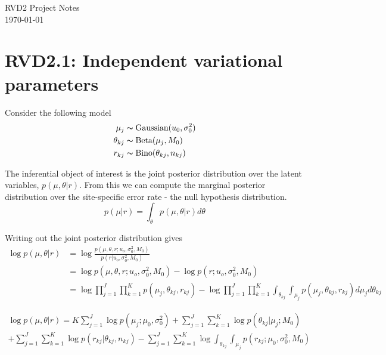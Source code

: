 \documentclass[10pt, letterpaper]{article}
\begin{document}
\linespread{1} %
\small \normalsize %
\begin{flushright}
RVD2 Project Notes \\
\today
\end{flushright}

\section*{RVD2.1: Independent variational parameters}

Consider the following model
\begin{align}
\mu_j &\thicksim \text{Gaussian}(u_0,\sigma^2_0)\\
\theta_{kj} &\thicksim \text{Beta}(\mu_j,M_0)\\
r_{kj} &\thicksim \text{Bino}(\theta_{kj}, n_{kj})
\end{align}

The inferential object of interest is the joint posterior distribution over the latent variables, $p(\mu,\theta|r)$. From this we can compute the marginal posterior distribution over the site-specific error rate - the null hypothesis distribution.
\begin{equation}
p(\mu|r) = \int_\theta p(\mu,\theta|r)d\theta
\end{equation}

Writing out the joint posterior distribution gives
\begin{equation}
\begin{split}
\log p(\mu,\theta | r)& = \log \frac{p(\mu,\theta,r;u_o,\sigma^2_0,M_0)}{p(r | u_o,\sigma^2_0,M_0)}\\
& = \log p(\mu,\theta,r;u_o,\sigma^2_0,M_0) - \log p(r ; u_o, \sigma^2_0,M_0)\\
& = \log \prod_{j=1}^J \prod_{k=1}^K p(\mu_j,\theta_{kj}, r_{kj}) - \log \prod_{j=1}^J \prod_{k=1}^K \int_{\theta_{kj}} \int_{\mu_j} p(\mu_j,\theta_{kj}, r_{kj})d\mu_jd\theta_{kj}
\end{split}
\end{equation}

\begin{multline}
\log p(\mu,\theta | r) = K\sum_{j=1}^J \log p(\mu_j;\mu_0,\sigma^2_0) 
	+\sum_{j=1}^J \sum_{k=1}^K \log p(\theta_{kj} | \mu_j;M_0)\\ 
	+\sum_{j=1}^J \sum_{k=1}^K\log p(r_{kj} | \theta_{kj}, n_{kj})
	- \sum_{j=1}^J \sum_{k=1}^K \log \int_{\theta_{kj}} \int_{\mu_j} p(r_{kj};\mu_0,\sigma^2_0,M_0) 
\end{multline}
\end{document}
